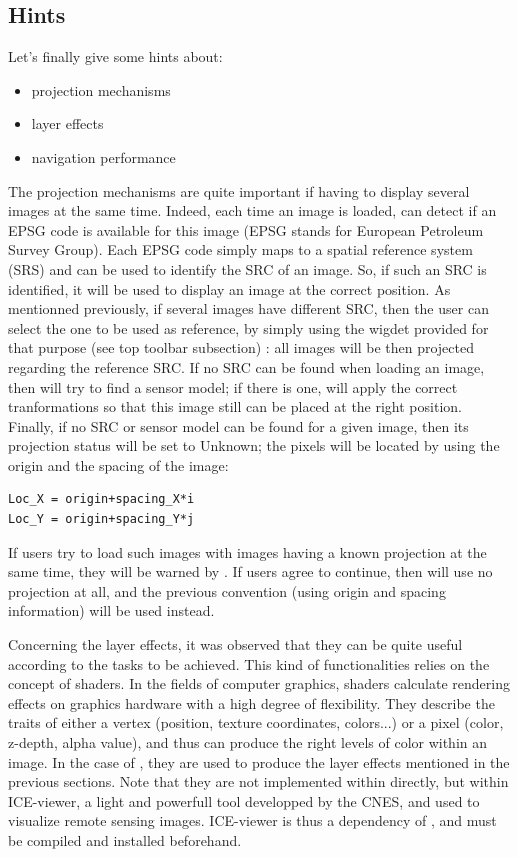 \subsection{Hints}\label{ssec:monhints}

Let's finally give some hints about:

\begin{itemize}
\item projection mechanisms
\item layer effects
\item navigation performance
\end{itemize}

The projection mechanisms are quite important if having to display several images at the same time.
Indeed, each time an image is loaded, \mont can detect if an EPSG code is available for this image (EPSG stands for European Petroleum Survey Group). 
Each EPSG code simply maps to a spatial reference system (SRS) and can be used to identify the SRC of an image.
So, if such an SRC is identified, it will be used to display an image at the correct position. As mentionned previously, if several images have different SRC,
then the user can select the one to be used as reference, by simply using the wigdet provided for that purpose (see top toolbar subsection) : all images will be then projected regarding the reference SRC.
If no SRC can be found when loading an image, then \mont will try to find a sensor model; if there is one, \mont will apply the correct tranformations so that this image still can be placed at the right position.
Finally, if no SRC or sensor model can be found for a given image, then its projection status will be set to Unknown; the pixels will be located by using the origin and the spacing of the image:
\begin{verbatim}
Loc_X = origin+spacing_X*i
Loc_Y = origin+spacing_Y*j
\end{verbatim}
If users try to load such images with images having a known projection at the same time, they will be warned by \mont.
If users agree to continue, then \mont will use no projection at all, and the previous convention (using origin and spacing information) will be used instead.

Concerning the layer effects, it was observed that they can be quite useful according to the tasks to be achieved.
This kind of functionalities relies on the concept of shaders. In the fields of computer graphics, shaders calculate rendering effects on graphics hardware with a high degree of flexibility.
They describe the traits of either a vertex (position, texture coordinates, colors...) or a pixel (color, z-depth, alpha value), and thus can produce the right levels of color within an image.
In the case of \mont, they are used to produce the layer effects mentioned in the previous sections. 
Note that they are not implemented within \mont directly, but within ICE-viewer, a light and powerfull tool developped by the CNES, and used to visualize remote sensing images.
ICE-viewer is thus a dependency of \mont, and must be compiled and installed beforehand.

